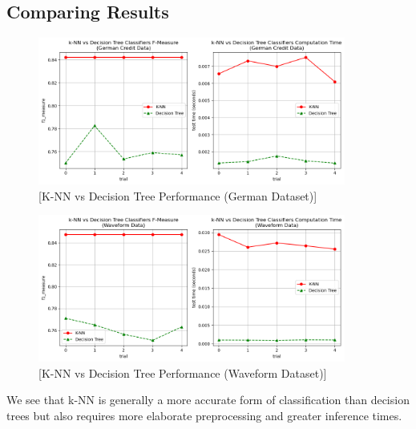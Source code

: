 \documentclass{article}
\begin{document}
    \newpage

    \subsection*{Comparing Results}

    \begin{figure}[H]
        \centering
        \includegraphics[width=0.9\textwidth, height=0.25\textheight]{./I_3_g.png}
        \caption{[K-NN vs Decision Tree Performance (German Dataset)]}
    \end{figure}
    \begin{figure}[H]
        \centering
        \includegraphics[width=0.9\textwidth, height=0.25\textheight]{./I_3_w.png}
        \caption{[K-NN vs Decision Tree Performance (Waveform Dataset)]}
    \end{figure}

    We see that k-NN is generally a more accurate form of classification than
    decision trees but also requires more elaborate preprocessing and greater
    inference times.
    
    \newpage
\end{document}
